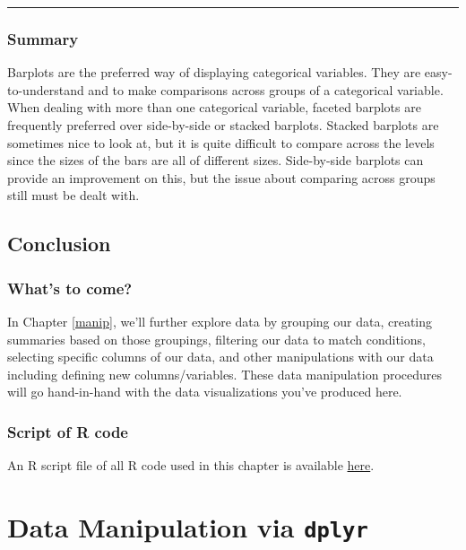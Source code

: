 \documentclass[]{tufte-book}
\let\oldrule=\rule
\renewcommand{\rule}[1]{\oldrule{\linewidth}}
\begin{document}
\begin{center}\rule{0.5\linewidth}{\linethickness}\end{center}

\subsection{Summary}\label{summary-4}

Barplots are the preferred way of displaying categorical variables. They
are easy-to-understand and to make comparisons across groups of a
categorical variable. When dealing with more than one categorical
variable, faceted barplots are frequently preferred over side-by-side or
stacked barplots. Stacked barplots are sometimes nice to look at, but it
is quite difficult to compare across the levels since the sizes of the
bars are all of different sizes. Side-by-side barplots can provide an
improvement on this, but the issue about comparing across groups still
must be dealt with.

\section{Conclusion}\label{conclusion}

\subsection{What's to come?}\label{whats-to-come-1}

In Chapter \ref{manip}, we'll further explore data by grouping our data,
creating summaries based on those groupings, filtering our data to match
conditions, selecting specific columns of our data, and other
manipulations with our data including defining new columns/variables.
These data manipulation procedures will go hand-in-hand with the data
visualizations you've produced here.

\subsection{Script of R code}\label{script-of-r-code}

An R script file of all R code used in this chapter is available
\href{http://ismayc.github.io/moderndiver-book/04-viz.R}{here}.

\chapter{\texorpdfstring{Data Manipulation via
\texttt{dplyr}}{Data Manipulation via dplyr}}\label{data-manipulation-via-dplyr}
\end{document}

